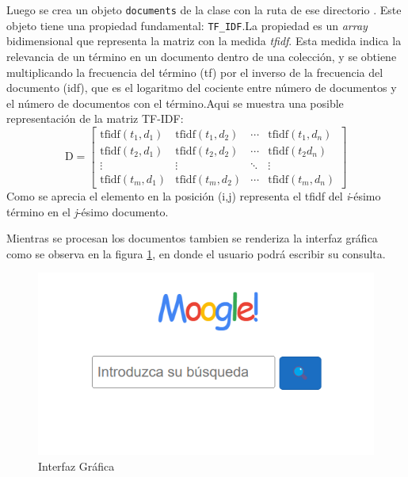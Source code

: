 \documentclass{beamer}
\begin{document}
\begin{frame}
Luego se crea un objeto \texttt{documents} de la clase  con la ruta de ese directorio . Este objeto tiene una propiedad fundamental: \texttt{TF\_IDF}.La propiedad es un \textit{array} bidimensional que representa la matriz con la medida \textit{tfidf}. Esta medida indica la relevancia de un término en un documento dentro de una colección, y se obtiene multiplicando la frecuencia del término (tf) por el inverso de la frecuencia del documento (idf), que es el logaritmo del cociente entre número de documentos y el número de documentos con el término.Aqui se muestra una posible representación de la matriz TF-IDF:
\begin{equation*}
\label{eq:matriztfidf}
\text{D} =
\begin{bmatrix}
\text{tfidf}(t_1, d_1) & \text{tfidf}(t_1, d_2) & \cdots & \text{tfidf}(t_1, d_n) \\
\text{tfidf}(t_2, d_1) & \text{tfidf}(t_2, d_2) & \cdots & \text{tfidf}(t_2 d_n) \\
\vdots & \vdots & \ddots & \vdots \\
\text{tfidf}(t_m, d_1) & \text{tfidf}(t_m, d_2) & \cdots & \text{tfidf}(t_m, d_n)
\end{bmatrix}
\end{equation*}
Como se aprecia el elemento en la posición (i,j) representa el tfidf del \textit{i}-ésimo término en el \textit{j}-ésimo documento.

\end{frame}
\begin{frame}
    Mientras se procesan los documentos tambien se renderiza la interfaz gráfica como se observa en la figura  \ref{fig:ui}, en donde el usuario podrá escribir su consulta.


    \begin{figure}
        \centering
        \includegraphics[width=0.75\linewidth]{ui.png}
        \caption{Interfaz Gráfica}
        \label{fig:ui}
    \end{figure}
\end{frame}
\end{document}

